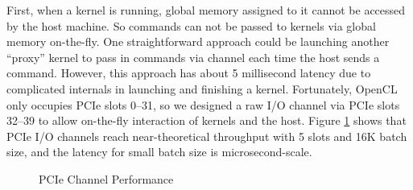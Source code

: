 {First, when a kernel is running, global memory assigned to it cannot be accessed by the host machine. So commands can not be passed to kernels via global memory on-the-fly. One straightforward approach could be launching another ``proxy'' kernel to pass in commands via channel each time the host sends a command. However, this approach has about 5 millisecond latency due to complicated internals in launching and finishing a kernel. Fortunately, OpenCL only occupies PCIe slots 0--31, so we designed a raw I/O channel via PCIe slots 32--39 to allow on-the-fly interaction of kernels and the host. Figure \ref{fig:PCIeChannelPerf} shows that PCIe I/O channels reach near-theoretical throughput with 5 slots and 16K batch size, and the latency for small batch size is microsecond-scale.

\begin{figure}[h!]
	\centering
	\vspace{-0.15in}
	\caption{PCIe Channel Performance}
	\vspace{-0.15in}
	\label{fig:PCIeChannelPerf}
\end{figure}

}
